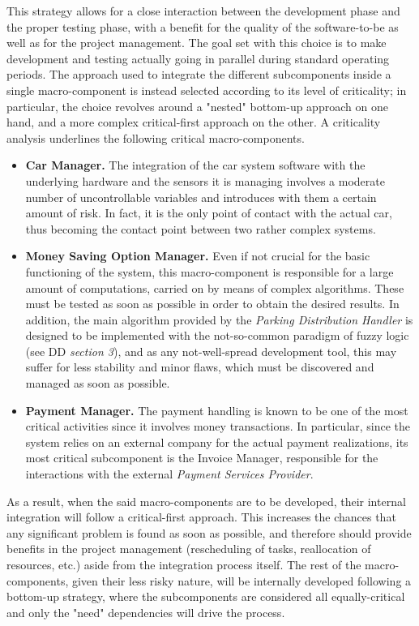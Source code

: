 	This strategy allows for a close interaction between the development phase and the proper testing phase, with a benefit for the quality of the software-to-be as well as for the project management. The goal set with this choice is to make development and testing actually going in parallel during standard operating periods.\newline %
	The approach used to integrate the different subcomponents inside a single macro-component is instead selected according to its level of criticality; in particular, the choice revolves around a "nested" bottom-up approach on one hand, and a more complex critical-first approach on the other.\newline
	A criticality analysis underlines the following critical macro-components.
	\begin{itemize}
		\item \textbf{Car Manager.} The integration of the car system software with the underlying hardware and the sensors it is managing involves a moderate number of uncontrollable variables and introduces with them a certain amount of risk. In fact, it is the only point of contact with the actual car, thus becoming the contact point between two rather complex systems.
		\item \textbf{Money Saving Option Manager.} Even if not crucial for the basic functioning of the system, this macro-component is responsible for a large amount of computations, carried on by means of complex algorithms. These must be tested as soon as possible in order to obtain the desired results. In addition, the main algorithm provided by the \textit{Parking Distribution Handler} is designed to be implemented with the not-so-common paradigm of fuzzy logic (see DD \textit{section 3}), and as any not-well-spread development tool, this may suffer for less stability and minor flaws, which must be discovered and managed as soon as possible.
		\item \textbf{Payment Manager.} The payment handling is known to be one of the most critical activities since it involves money transactions. In particular, since the system relies on an external company for the actual payment realizations, its most critical subcomponent is the Invoice Manager, responsible for the interactions with the external \textit{Payment Services Provider}.
	\end{itemize}
	As a result, when the said macro-components are to be developed, their internal integration will follow a critical-first approach. This increases the chances that any significant problem is found as soon as possible, and therefore should provide benefits in the project management (rescheduling of tasks, reallocation of resources, etc.) aside from the integration process itself.\newline
	The rest of the macro-components, given their less risky nature, will be internally developed following a bottom-up strategy, where the subcomponents are considered all equally-critical and only the "need" dependencies will drive the process.
\FloatBarrier

